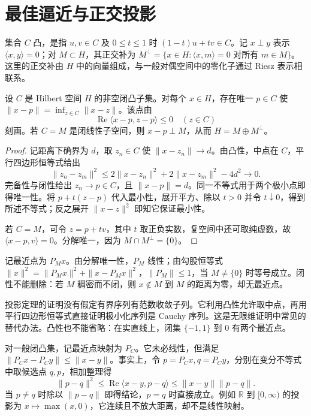 \section{最佳逼近与正交投影}
集合 $C$ 凸，是指 $u,v\in C$ 及 $0\leq t\leq1$ 时 $(1-t)u+tv\in C$。记 $x\perp y$ 表示 $\langle x,y\rangle=0$；对 $M\subset H$，其正交补为 $M^\perp=\{x\in H:\langle x,m\rangle=0\text{ 对所有 }m\in M\}$。这里的正交补由 $H$ 中的向量组成，与一般对偶空间中的零化子通过 Riesz 表示相联系。
\begin{theorem}[投影定理]\label{thm:fa-projection}
设 $C$ 是 Hilbert 空间 $H$ 的非空闭凸子集。对每个 $x\in H$，存在唯一 $p\in C$ 使 $\|x-p\|=\inf_{z\in C}\|x-z\|$。该点由
\[
 \operatorname{Re}\langle x-p,z-p\rangle\leq0\quad(z\in C)
\]
刻画。若 $C=M$ 是闭线性子空间，则 $x-p\perp M$，从而 $H=M\oplus M^\perp$。
\end{theorem}
\begin{proof}
记距离下确界为 $d$，取 $z_n\in C$ 使 $\|x-z_n\|\to d$。由凸性，中点在 $C$，平行四边形恒等式给出
\[
 \|z_n-z_m\|^2\leq2\|x-z_n\|^2+2\|x-z_m\|^2-4d^2\to0.
\]
完备性与闭性给出 $z_n\to p\in C$，且 $\|x-p\|=d$。同一不等式用于两个极小点即得唯一性。将 $p+t(z-p)$ 代入最小性，展开平方、除以 $t>0$ 并令 $t\downarrow0$，得到所述不等式；反之展开 $\|x-z\|^2$ 即知它保证最小性。

若 $C=M$，可令 $z=p+tv$，其中 $t$ 取正负实数，复空间中还可取纯虚数，故 $\langle x-p,v\rangle=0$。分解唯一，因为 $M\cap M^\perp=\{0\}$。
\end{proof}
记最近点为 $P_Mx$。由分解唯一性，$P_M$ 线性；由勾股恒等式 $\|x\|^2=\|P_Mx\|^2+\|x-P_Mx\|^2$，$\|P_M\|\leq1$，当 $M\ne\{0\}$ 时等号成立。闭性不能删除：若 $M$ 稠密而不闭，则 $x\notin M$ 到 $M$ 的距离为零，却无最近点。

投影定理的证明没有假定有界序列有范数收敛子列。它利用凸性允许取中点，再用平行四边形恒等式直接证明极小化序列是 Cauchy 序列。这是无限维证明中常见的替代办法。凸性也不能省略：在实直线上，闭集 $\{-1,1\}$ 到 $0$ 有两个最近点。

对一般闭凸集，记最近点映射为 $P_C$。它未必线性，但满足 $\|P_Cx-P_Cy\|\leq\|x-y\|$。事实上，令 $p=P_Cx,q=P_Cy$，分别在变分不等式中取候选点 $q,p$，相加整理得
\[
 \|p-q\|^2\leq\operatorname{Re}\langle x-y,p-q\rangle
 \leq\|x-y\|\|p-q\|.
\]
当 $p\ne q$ 时除以 $\|p-q\|$ 即得结论，$p=q$ 时直接成立。例如 $\mathbb R$ 到 $[0,\infty)$ 的投影为 $x\mapsto\max(x,0)$，它连续且不放大距离，却不是线性映射。

